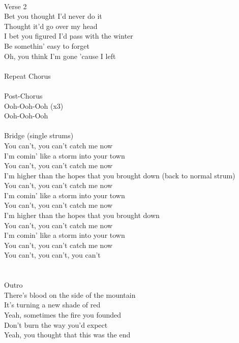 \\
Verse 2\\
Bet you thought I'd never do it\\
Thought it'd go over my head\\
I bet you figured I'd pass with the winter\\
Be somethin' easy to forget\\
Oh, you think I'm gone 'cause I left\\
\\
Repeat Chorus\\
\\
Post-Chorus\\
Ooh-Ooh-Ooh   (x3)\\
Ooh-Ooh-Ooh \\
\\
Bridge (single strums)\\
You can't, you can't catch me now\\
I'm comin' like a storm into your town\\
You can't, you can't catch me now\\
I'm higher than the hopes that you brought down  (back to normal strum)\\
You can't, you can't catch me now\\
I'm comin' like a storm into your town\\
You can't, you can't catch me now\\
I'm higher than the hopes that you brought down\\
You can't, you can't catch me now\\
I'm comin' like a storm into your town\\
You can't, you can't catch me now\\
You can't, you can't, you can't  \\
  \\
\\
Outro\\
There's blood on the side of the mountain\\
It's turning a new shade of red\\
Yeah, sometimes the fire you founded\\
Don't burn the way you'd expect\\
Yeah, you thought that this was the end\\




